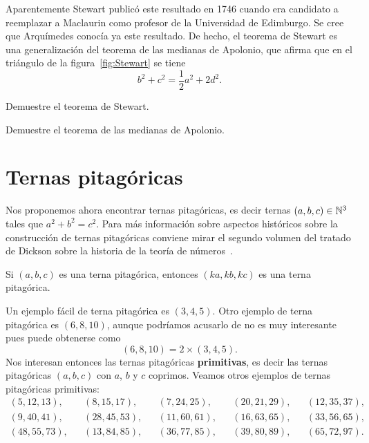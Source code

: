 Aparentemente Stewart publicó este resultado en 1746 cuando era candidato a
reemplazar a Maclaurin como profesor de la Universidad de Edimburgo.  Se cree
que Arquímedes conocía ya este resultado. De hecho, el teorema de Stewart es
una generalización del teorema de las medianas de Apolonio, que afirma 
que en el triángulo de la figura~\ref{fig:Stewart} se tiene
\[
	b^2+c^2=\frac12a^2+2d^2.
\]

\begin{exercise}
	Demuestre el teorema de Stewart.
\end{exercise}

\begin{exercise}
	Demuestre el teorema de las medianas de Apolonio.
\end{exercise}

\section*{Ternas pitagóricas}

Nos proponemos ahora encontrar ternas pitagóricas, es decir ternas
$(a,b,c)\in\mathbb{N}^3$ tales que $a^2+b^2=c^2$.  Para más información sobre aspectos
históricos sobre la construcción de ternas pitagóricas conviene mirar el
segundo volumen del tratado de Dickson sobre la historia de la teoría de
números~\cite{MR0245500}. 

\begin{exercise}
	Si $(a,b,c)$ es una terna pitagórica, entonces $(ka,kb,kc)$
	es una terna pitagórica.
\end{exercise}

Un ejemplo fácil de terna
pitagórica es $(3,4,5)$. 
Otro ejemplo de terna pitagórica es $(6,8,10)$, aunque podríamos acusarlo de no
es muy interesante pues puede obtenerse como 
\[
(6,8,10)=2\times (3,4,5). 
\]
Nos interesan entonces las ternas pitagóricas
\textbf{primitivas}, es decir las ternas pitagóricas $(a,b,c)$ con $a$, $b$ y $c$
coprimos. Veamos otros ejemplos de ternas pitagóricas primitivas:
\begin{align*}
	(5,12,13), &&
	(8,15,17), &&
	(7,24,25), && 
	(20,21,29),&&
	(12,35,37), \\
	(9,40,41), &&
	(28,45,53),&&
	(11,60,61),&&
	(16, 63, 65),&&
	(33, 56, 65),\\
	(48, 55, 73),&&
	(13, 84, 85),&&
	(36, 77, 85),&&
	(39, 80, 89),&&
	(65, 72, 97).
\end{align*}

